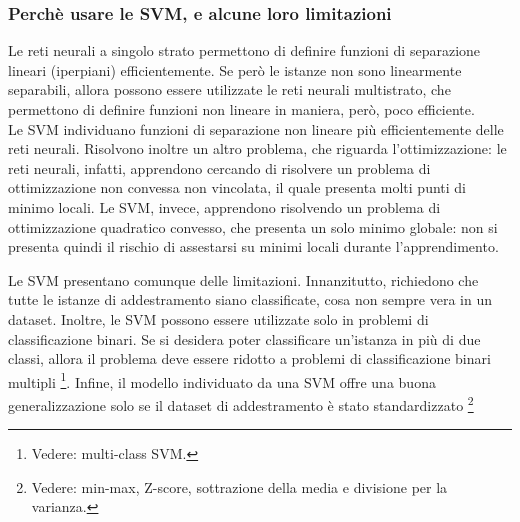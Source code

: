 \subsubsection{Perchè usare le SVM, e alcune loro limitazioni}
Le reti neurali a singolo strato permettono di definire funzioni di separazione lineari (iperpiani) efficientemente. Se però le istanze non sono linearmente separabili, allora possono essere utilizzate le reti neurali multistrato, che permettono di definire funzioni non lineare in maniera, però, poco efficiente.\\
Le SVM individuano funzioni di separazione non lineare più efficientemente delle reti neurali. Risolvono inoltre un altro problema, che riguarda l'ottimizzazione: le reti neurali, infatti, apprendono cercando di risolvere un problema di ottimizzazione non convessa non vincolata, il quale presenta molti punti di minimo locali. Le SVM, invece, apprendono risolvendo un problema di ottimizzazione quadratico convesso, che presenta un solo minimo globale: non si presenta quindi il rischio di assestarsi su minimi locali durante l'apprendimento.

Le SVM presentano comunque delle limitazioni. Innanzitutto, richiedono che tutte le istanze di addestramento siano classificate, cosa non sempre vera in un dataset.
Inoltre, le SVM possono essere utilizzate solo in problemi di classificazione binari. Se si desidera poter classificare un'istanza in più di due classi, allora il problema deve essere ridotto a problemi di classificazione binari multipli \footnote{Vedere: multi-class SVM.}.
Infine, il modello individuato da una SVM offre una buona generalizzazione solo se il dataset di addestramento è stato standardizzato \footnote{Vedere: min-max, Z-score, sottrazione della media e divisione per la varianza.}

